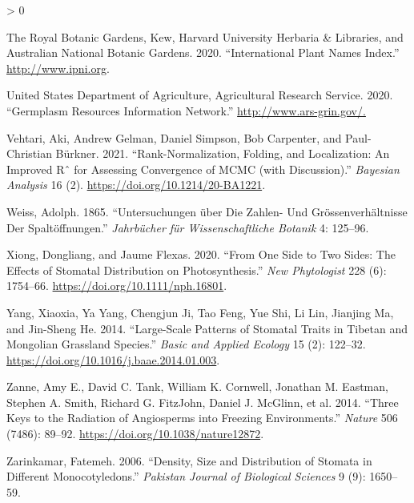 \documentclass[
  10pt,
]{article}
\newlength{\cslhangindent}
\newenvironment{CSLReferences}[2] %
 {%
  \setlength{\parindent}{0pt}
  \ifodd #1 \everypar{\setlength{\hangindent}{\cslhangindent}}\ignorespaces\fi
  \ifnum #2 > 0
  \setlength{\parskip}{#2\baselineskip}
  \fi
 }%
 {}
\begin{document}
\begin{CSLReferences}{1}{0}
\leavevmode\hypertarget{ref-the_royal_botanic_gardens_international_2020}{}%
The Royal Botanic Gardens, Kew, Harvard University Herbaria \& Libraries, and Australian National Botanic Gardens. 2020. {``International {Plant} {Names} {Index}.''} \url{http://www.ipni.org}.

\leavevmode\hypertarget{ref-united_states_department_of_agriculture_agricultural_research_service_germplasm_2020}{}%
United States Department of Agriculture, Agricultural Research Service. 2020. {``Germplasm {Resources} {Information} {Network}.''} \url{http://www.ars-grin.gov/.}

\leavevmode\hypertarget{ref-vehtari_rank-normalization_2021}{}%
Vehtari, Aki, Andrew Gelman, Daniel Simpson, Bob Carpenter, and Paul-Christian Bürkner. 2021. {``Rank-{Normalization}, {Folding}, and {Localization}: {An} {Improved} {Rˆ} for {Assessing} {Convergence} of {MCMC} (with {Discussion}).''} \emph{Bayesian Analysis} 16 (2). \url{https://doi.org/10.1214/20-BA1221}.

\leavevmode\hypertarget{ref-weiss_untersuchungen_1865}{}%
Weiss, Adolph. 1865. {``Untersuchungen über Die {Zahlen}- Und {Grössenverhältnisse} Der {Spaltöffnungen}.''} \emph{Jahrbücher für Wissenschaftliche Botanik} 4: 125--96.

\leavevmode\hypertarget{ref-xiong_one_2020}{}%
Xiong, Dongliang, and Jaume Flexas. 2020. {``From One Side to Two Sides: The Effects of Stomatal Distribution on Photosynthesis.''} \emph{New Phytologist} 228 (6): 1754--66. \url{https://doi.org/10.1111/nph.16801}.

\leavevmode\hypertarget{ref-yang_large-scale_2014}{}%
Yang, Xiaoxia, Ya Yang, Chengjun Ji, Tao Feng, Yue Shi, Li Lin, Jianjing Ma, and Jin-Sheng He. 2014. {``Large-Scale Patterns of Stomatal Traits in {Tibetan} and {Mongolian} Grassland Species.''} \emph{Basic and Applied Ecology} 15 (2): 122--32. \url{https://doi.org/10.1016/j.baae.2014.01.003}.

\leavevmode\hypertarget{ref-zanne_three_2014}{}%
Zanne, Amy E., David C. Tank, William K. Cornwell, Jonathan M. Eastman, Stephen A. Smith, Richard G. FitzJohn, Daniel J. McGlinn, et al. 2014. {``Three Keys to the Radiation of Angiosperms into Freezing Environments.''} \emph{Nature} 506 (7486): 89--92. \url{https://doi.org/10.1038/nature12872}.

\leavevmode\hypertarget{ref-zarinkamar_density_2006}{}%
Zarinkamar, Fatemeh. 2006. {``Density, Size and Distribution of Stomata in Different Monocotyledons.''} \emph{Pakistan Journal of Biological Sciences} 9 (9): 1650--59.


\end{CSLReferences}
\end{document}
